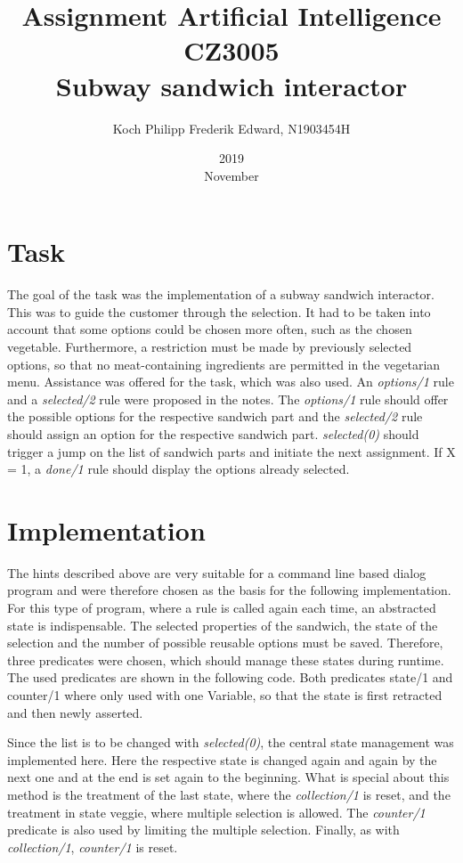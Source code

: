\documentclass{article}
\title{Assignment Artificial Intelligence CZ3005 \\ Subway sandwich interactor}
\date{2019 \\ November}
\author{Koch Philipp Frederik Edward, N1903454H}
\begin{document}
	\maketitle
	\section{Task}
	The goal of the task was the implementation of a subway sandwich interactor. This was to guide the customer through the selection. It had to be taken into account that some options could be chosen more often, such as the chosen vegetable. Furthermore, a restriction must be made by previously selected options, so that no meat-containing ingredients are permitted in the vegetarian menu. Assistance was offered for the task, which was also used. An \textit{options/1} rule and a \textit{selected/2} rule were proposed in the notes. The \textit{options/1} rule should offer the possible options for the respective sandwich part and the \textit{selected/2} rule should assign an option for the respective sandwich part. \textit{selected(0)} should trigger a jump on the list of sandwich parts and initiate the next assignment. If X = 1, a \textit{done/1} rule should display the options already selected. 

	\section{Implementation}
	The hints described above are very suitable for a command line based dialog program and were therefore chosen as the basis for the following implementation. For this type of program, where a rule is called again each time, an abstracted state is indispensable. The selected properties of the sandwich, the state of the selection and the number of possible reusable options must be saved. Therefore, three predicates were chosen, which should manage these states during runtime. The used predicates are shown in the following code. Both predicates state/1 and counter/1 where only used with one Variable, so that the state is first retracted and then newly asserted.
	
	
	
	
	Since the list is to be changed with \textit{selected(0)}, the central state management was implemented here. Here the respective state is changed again and again by the next one and at the end is set again to the beginning. What is special about this method is the treatment of the last state, where the \textit{collection/1} is reset, and the treatment in state veggie, where multiple selection is allowed. The \textit{counter/1} predicate is also used by limiting the multiple selection. Finally, as with \textit{collection/1}, \textit{counter/1} is reset.
	
\end{document}
